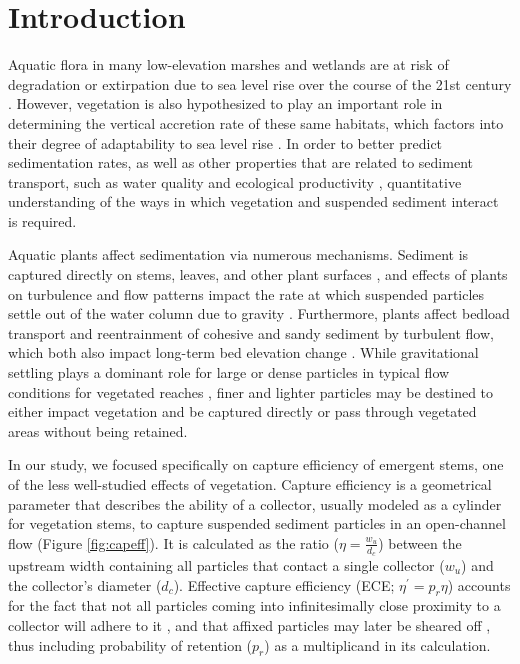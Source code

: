 \documentclass[geosciences,article,submit,moreauthors,pdftex]{Definitions/mdpi}
\begin{document}
\section{Introduction}

Aquatic flora in many low-elevation marshes and wetlands are at risk of degradation or extirpation due to sea level rise over the course of the 21st century \cite{thorne2018us,jankowski2017vulnerability}. However, vegetation is also hypothesized to play an important role in determining the vertical accretion rate of these same habitats, which factors into their degree of adaptability to sea level rise \cite{kirwan2010limits}. In order to better predict sedimentation rates, as well as other properties that are related to sediment transport, such as water quality \cite{goodwin2003temporal} and ecological productivity \cite{kirwan2007coupled}, quantitative understanding of the ways in which vegetation and suspended sediment interact is required.

Aquatic plants affect sedimentation via numerous mechanisms. Sediment is captured directly on stems, leaves, and other plant surfaces \cite{mudd2010does, peruzzo2012capillary}, and effects of plants on turbulence and flow patterns impact the rate at which suspended particles settle out of the water column due to gravity \cite{christiansen2000flow, leonard1995flow, Nielsen_1993, Jacobs_2016, Wang_2018}. Furthermore, plants affect bedload transport \cite{yager2013influence, yang2019impact, jordanova2003experimental} and reentrainment of cohesive \cite{d2007landscape} and sandy \cite{tinoco2018turbulence} sediment by turbulent flow, which both also impact long-term bed elevation change \cite{wu2005depth,d2007landscape}. While gravitational settling plays a dominant role for large or dense particles in typical flow conditions for vegetated reaches \cite{mudd2010does, leonard1995flow}, finer and lighter particles may be destined to either impact vegetation and be captured directly or pass through vegetated areas without being retained.

In our study, we focused specifically on capture efficiency of emergent stems, one of the less well-studied effects of vegetation. Capture efficiency is a geometrical parameter that describes the ability of a collector, usually modeled as a cylinder for vegetation stems, to capture suspended sediment particles in an open-channel flow (Figure \ref{fig:capeff}). It is calculated as the ratio ($\eta=\frac{w_u}{d_c}$) between the upstream width containing all particles that contact a single collector ($w_u$) and the collector's diameter ($d_c$). Effective capture efficiency (ECE; $\eta^\prime=p_r\eta$) accounts for the fact that not all particles coming into infinitesimally close proximity to a collector will adhere to it \cite{spielman1977particle, wu2012single}, and that affixed particles may later be sheared off \cite{peruzzo2012capillary}, thus including probability of retention ($p_r$) as a multiplicand in its calculation.
\end{document}
